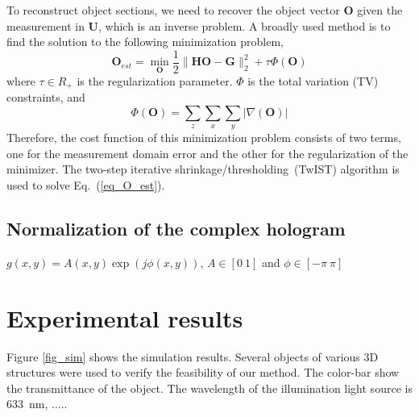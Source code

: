 \documentclass[9pt,twocolumn,twoside]{osajnl}
\begin{document}
To reconstruct object sections, we need to recover the object vector $\mathbf{O}$ given the measurement in $\mathbf{U}$, which is
an inverse problem. A broadly used method is to find the solution to the following minimization problem,
\begin{equation}
\mathbf{O}_{est} = \min_\mathbf{O} \frac{1}{2} \lVert \mathbf{H}\mathbf{O} - \mathbf{G} \rVert _2^2  + \tau \Phi(\mathbf{O})
\label{eq_O_est}
\end{equation}
where $\tau \in R_+$ is the regularization parameter. $\Phi$ is the total variation (TV) constraints, and
\begin{equation}
\Phi(\mathbf{O})=\sum_z\sum_x\sum_y\lvert \nabla (\mathbf{O})\rvert
\label{eq_TV}
\end{equation}
Therefore, the cost function of this minimization problem consists of two terms, one for the measurement domain error and the other for the regularization of the minimizer. 
The two-step iterative shrinkage/thresholding~(TwIST) algorithm is used to solve Eq.~(\ref{eq_O_est}).
%
%

\subsection{Normalization of the complex hologram}
$g(x,y)=A(x,y)\exp(j\phi(x,y))$, $A \in [0 ~ 1]$ and $\phi \in [-\pi ~ \pi]$ 
\section{Experimental results}\label{sec_results}

Figure \ref{fig_sim} shows the simulation results. 
Several objects of various 3D structures were used to verify the feasibility of our method. The color-bar show the transmittance of the object. 
The wavelength of the illumination light source is \SI{633}{\nano\meter}, ..... 
\end{document}
